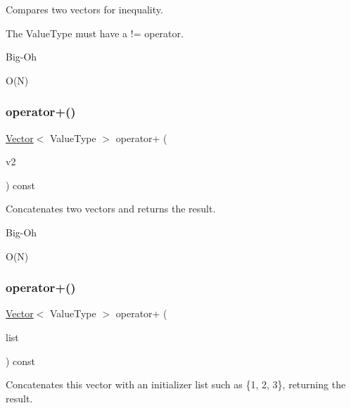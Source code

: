 Compares two vectors for inequality. 

The Value\+Type must have a != operator. \begin{DoxyRefDesc}{Big-\/\+Oh}
\item[\mbox{\hyperlink{BigOh__BigOh000147}{Big-\/\+Oh}}]O(\+N) \end{DoxyRefDesc}
\mbox{\label{classVector_acb70fcd67f846bf16b96223bcf43e476}} 
\subsubsection{\texorpdfstring{operator+()}{operator+()}\hspace{0.1cm}{\footnotesize\ttfamily [1/2]}}
{\footnotesize\ttfamily \mbox{\hyperlink{classVector}{Vector}}$<$ Value\+Type $>$ operator+ (\begin{DoxyParamCaption}\item[{const \mbox{\hyperlink{classVector}{Vector}}$<$ Value\+Type $>$ \&}]{v2 }\end{DoxyParamCaption}) const}



Concatenates two vectors and returns the result. 

\begin{DoxyRefDesc}{Big-\/\+Oh}
\item[\mbox{\hyperlink{BigOh__BigOh000141}{Big-\/\+Oh}}]O(\+N) \end{DoxyRefDesc}
\mbox{\label{classVector_a2dce2988ba5880d744280b4bbf85b135}} 
\subsubsection{\texorpdfstring{operator+()}{operator+()}\hspace{0.1cm}{\footnotesize\ttfamily [2/2]}}
{\footnotesize\ttfamily \mbox{\hyperlink{classVector}{Vector}}$<$ Value\+Type $>$ operator+ (\begin{DoxyParamCaption}\item[{std\+::initializer\+\_\+list$<$ Value\+Type $>$}]{list }\end{DoxyParamCaption}) const}



Concatenates this vector with an initializer list such as \{1, 2, 3\}, returning the result. 

